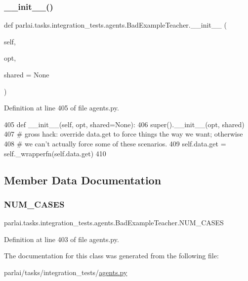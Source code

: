 \subsubsection{\texorpdfstring{\+\_\+\+\_\+init\+\_\+\+\_\+()}{\_\_init\_\_()}}
{\footnotesize\ttfamily def parlai.\+tasks.\+integration\+\_\+tests.\+agents.\+Bad\+Example\+Teacher.\+\_\+\+\_\+init\+\_\+\+\_\+ (\begin{DoxyParamCaption}\item[{}]{self,  }\item[{}]{opt,  }\item[{}]{shared = {\ttfamily None} }\end{DoxyParamCaption})}



Definition at line 405 of file agents.\+py.


\begin{DoxyCode}
405     \textcolor{keyword}{def }\_\_init\_\_(self, opt, shared=None):
406         super().\_\_init\_\_(opt, shared)
407         \textcolor{comment}{# gross hack: override data.get to force things the way we want; otherwise}
408         \textcolor{comment}{# we can't actually force some of these scenarios.}
409         self.data.get = self.\_wrapperfn(self.data.get)
410 
\end{DoxyCode}


\subsection{Member Data Documentation}
\mbox{\label{classparlai_1_1tasks_1_1integration__tests_1_1agents_1_1BadExampleTeacher_a6601002db5bfd2d4f70707b2fc59dc0e}} 
\subsubsection{\texorpdfstring{N\+U\+M\+\_\+\+C\+A\+S\+ES}{NUM\_CASES}}
{\footnotesize\ttfamily parlai.\+tasks.\+integration\+\_\+tests.\+agents.\+Bad\+Example\+Teacher.\+N\+U\+M\+\_\+\+C\+A\+S\+ES\hspace{0.3cm}{\ttfamily [static]}}



Definition at line 403 of file agents.\+py.



The documentation for this class was generated from the following file\+:\begin{DoxyCompactItemize}
\item 
parlai/tasks/integration\+\_\+tests/\hyperlink{parlai_2tasks_2integration__tests_2agents_8py}{agents.\+py}\end{DoxyCompactItemize}
